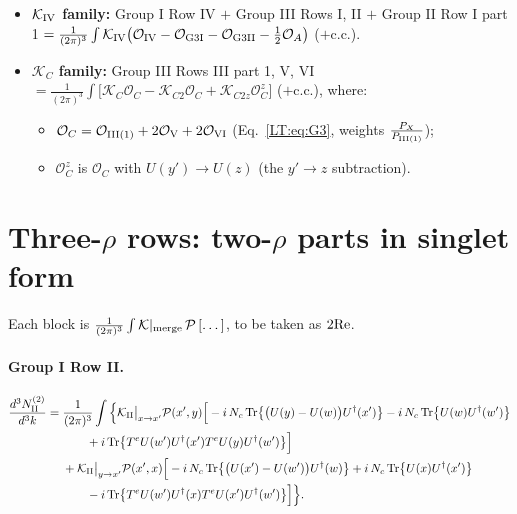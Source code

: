 \documentclass[10pt]{article}
\numberwithin{equation}{section}
\newcommand{\PP}{\mathcal P}
\newcommand{\Tr}{{\rm Tr}}
\newcommand{\Ud}{U^\dagger}
\newcommand{\OO}{\mathcal O}
\begin{document}
\begin{itemize}
\item \textbf{$\mathcal K_{\rm IV}$ family:} Group I Row IV $+$ Group III Rows I, II $+$ Group II Row I part 1 $=\frac{1}{(2\pi)^3}\int\mathcal K_{\rm IV}\big(\OO_{\rm IV}-\OO_{\rm G3I}-\OO_{\rm G3II}-\frac12\OO_{A}\big)$ ($+$c.c.).
\item \textbf{$\mathcal K_C$ family:} Group III Rows III part 1, V, VI $=\frac{1}{(2\pi)^3}\int\big[\mathcal K_C\OO_C-\mathcal K_{C2}\OO_C+\mathcal K_{C2z}\OO_C^{z}\big]$ ($+$c.c.), where:
\begin{itemize}
\item $\OO_C=\OO_{\rm III(1)}+2\OO_{\rm V}+2\OO_{\rm VI}$ (Eq.~\eqref{LT:eq:G3}, weights $\frac{P_X}{P_{\rm III(1)}}$);
\item $\OO_C^z$ is $\OO_C$ with $U(y')\to U(z)$ (the $y'\to z$ subtraction).
\end{itemize}
\end{itemize}

\section{Three-\texorpdfstring{$\rho$}{rho} rows: two-\texorpdfstring{$\rho$}{rho} parts in singlet form}\label{GS:sec:three}
Each block is $\frac{1}{(2\pi)^3}\int\mathcal K|_{\rm merge}\,\PP\,[\dots]$, to be taken as $2{\rm Re}$.

\paragraph{Group I Row II.}
\begin{align}
\frac{d^3N^{(2)}_{\rm II}}{d^3k}={}&\frac{1}{(2\pi)^3}\int\Big\{\mathcal K_{\rm II}\big|_{x\to x'}\PP(x',y)\Big[-i\,N_c\,\Tr\big\{\big(U(y)-U(w)\big)\Ud(x')\big\}-i\,N_c\,\Tr\big\{U(w)\Ud(w')\big\}\notag\\&\qquad+i\,\Tr\big\{T^eU(w')\Ud(x')T^eU(y)\Ud(w')\big\}\Big]\notag\\
&+\mathcal K_{\rm II}\big|_{y\to x'}\PP(x',x)\Big[-i\,N_c\,\Tr\big\{\big(U(x')-U(w')\big)\Ud(w)\big\}+i\,N_c\,\Tr\big\{U(x)\Ud(x')\big\}\notag\\&\qquad-i\,\Tr\big\{T^eU(w')\Ud(x)T^eU(x')\Ud(w')\big\}\Big]\Big\}.
\end{align}
\end{document}
